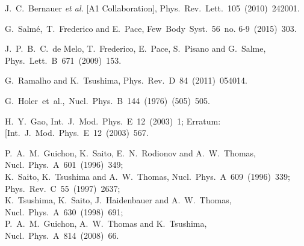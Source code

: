 \documentclass[preprint,aps,showpacs,floatfix]{revtex4}
\begin{document}
\begin{thebibliography}{99}
  J.~C.~Bernauer {\it et al.} [A1 Collaboration],
  Phys.~Rev.~Lett.~105~(2010)~242001. %

  
  G.~Salm\'e,~T.~Frederico and E.~Pace,
  Few~Body~Syst.~56~no. 6-9~(2015)~303.  %

  
  J.~P.~B.~C.~de Melo, T.~Frederico, E.~Pace, S.~Pisano and G.~Salme,
  Phys.\ Lett.\ B~671~(2009)~153.  %
  
   
  G.~Ramalho and K.~Tsushima,
  Phys.~Rev.~D~84~(2011)~054014.   %
  
  
 G.~Holer~et~al.,~Nucl.~Phys.~B~144~(1976)~(505)~505.


  H.~Y.~Gao,
  Int.\ J.\ Mod.\ Phys.\ E~12~(2003)~1;  
  Erratum: [Int.\ J.\ Mod.\ Phys.~E~12~(2003)~567.  %


  
P.~A.~M.~Guichon, 
K.~Saito, E.~N.~Rodionov and A.~W.~Thomas,
  Nucl.~Phys.~A~601~(1996)~349;\\
  K.~Saito, K.~Tsushima and A.~W.~Thomas,
  Nucl.~Phys.~A~609~(1996)~339;
  Phys.~Rev.~C~55~(1997)~2637;\\
  K.~Tsushima, K.~Saito, J.~Haidenbauer and A.~W.~Thomas,
  Nucl.\ Phys.\ A~630~(1998)~691; \\
  P.~A.~M.~Guichon, A.~W.~Thomas and K.~Tsushima,
  Nucl.\ Phys.~A~814~(2008)~66.



\end{thebibliography}
\end{document}
